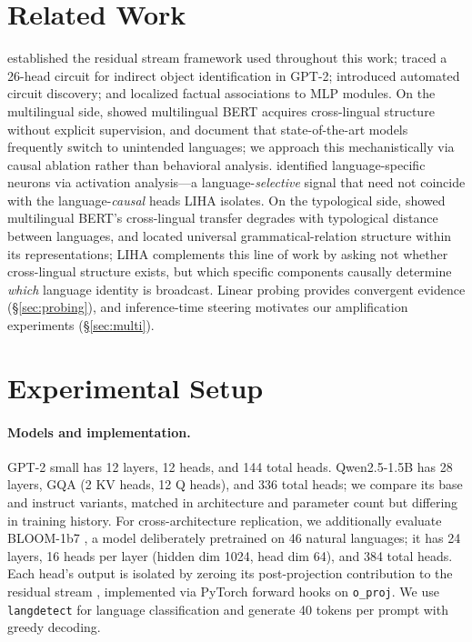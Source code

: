\documentclass[11pt]{article}
\begin{document}
\section{Related Work}

\citet{elhage2021} established the residual stream framework used
throughout this work; \citet{wang2022interpretability} traced a
26-head circuit for indirect object identification in GPT-2;
\citet{conmy2023towards} introduced automated circuit discovery; and
\citet{meng2022} localized factual associations to MLP modules. On the
multilingual side, \citet{conneau2020} showed multilingual BERT
acquires cross-lingual structure without explicit supervision, and
\citet{marchisio-etal-2024-understanding} document that state-of-the-art
models frequently switch to unintended languages; we approach this
mechanistically via causal ablation rather than behavioral analysis.
\citet{tang-etal-2024-language} identified language-specific neurons via
activation analysis---a language-\emph{selective} signal that need not
coincide with the language-\emph{causal} heads LIHA isolates. On the
typological side, \citet{pires2019multilingual} showed multilingual
BERT's cross-lingual transfer degrades with typological distance
between languages, and \citet{chi2020finding} located universal
grammatical-relation structure within its representations; LIHA
complements this line of work by asking not whether cross-lingual
structure exists, but which specific components causally determine
\emph{which} language identity is broadcast. Linear
probing \citep{alain2016, tenney2019} provides convergent evidence
(\S\ref{sec:probing}), and inference-time steering
\citep{zou2023, li2023} motivates our amplification experiments
(\S\ref{sec:multi}).

\section{Experimental Setup}
\label{sec:setup}

\paragraph{Models and implementation.} GPT-2 small \citep{radford2019}
has 12 layers, 12 heads, and 144 total heads. Qwen2.5-1.5B
\citep{qwen2025} has 28 layers, GQA (2 KV heads, 12 Q heads), and 336
total heads; we compare its base and instruct variants, matched in
architecture and parameter count but differing in training history. For cross-architecture
replication, we additionally evaluate BLOOM-1b7 \citep{bigscience2022bloom},
a model deliberately pretrained on 46 natural languages; it has 24 layers,
16 heads per layer (hidden dim 1024, head dim 64), and 384 total heads.
Each head's output
is isolated by zeroing its post-projection contribution to the residual
stream \citep{elhage2021}, implemented via PyTorch forward hooks on
\texttt{o\_proj}. We use \texttt{langdetect} \citep{shuyo2010} for
language classification and generate 40 tokens per prompt with greedy
decoding.
\end{document}
